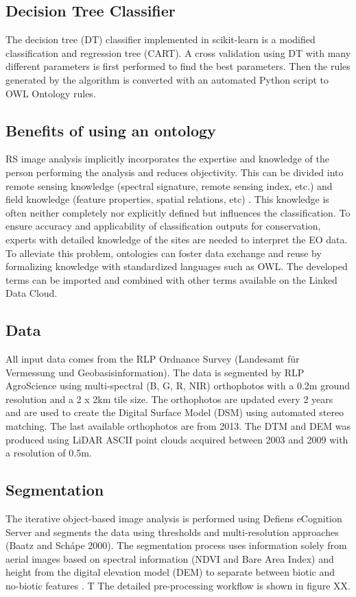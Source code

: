 \documentclass[authoryear, review,12pt,number]{elsarticle}
\begin{document}
\subsection{Decision Tree Classifier}
The decision tree (DT) classifier implemented in scikit-learn is a modified
classification and regression tree (CART)\citep{scikit-learn}. A cross
validation using DT with many different parameters is first performed to find
the best parameters. Then the rules generated by the algorithm is converted
with an automated Python script to OWL Ontology rules.

\subsection{Benefits of using an ontology}
RS image analysis implicitly incorporates the expertise and
knowledge of the person performing the analysis and reduces objectivity. This
can be divided into remote sensing knowledge (spectral signature, remote
sensing index, etc.) and field knowledge (feature properties, spatial
relations, etc) \citep{Andres2013a}. This knowledge is often neither completely
nor explicitly defined but influences the classification. To ensure accuracy and
applicability of classification outputs for conservation, experts with detailed
knowledge of the sites are needed to interpret the EO data. To alleviate this
problem, ontologies can foster data exchange and reuse by formalizing knowledge
with standardized languages such as OWL. The developed terms can be imported and
combined with other terms available on the Linked Data Cloud. 
\subsection{Data}
All input data comes from the RLP Ordnance Survey (Landesamt f\"ur Vermessung 
und Geobasisinformation). The data is segmented by RLP AgroScience using
multi-spectral (B, G, R, NIR) orthophotos with a 0.2m ground resolution and a
2 x 2km tile size. The orthophotos are updated every 2 years and are used to
create the Digital Surface Model (DSM) using automated stereo matching. The
last available orthophotos are from 2013. The DTM and
DEM was produced using LiDAR ASCII point clouds acquired between 2003 and 2009
with a resolution of 0.5m.\\
\subsection{Segmentation}
The iterative object-based image analysis is performed using Defiens eCognition
Server and segments the data using thresholds and multi-resolution approaches
(Baatz and Sch\'ape 2000). The segmentation process uses information solely
from aerial images based on spectral information (NDVI and Bare Area Index) and
height from the digital elevation model (DEM) to separate
between biotic and no-biotic features \citep{Tintrup2015}. T 
The detailed pre-processing workflow is shown in figure XX.
\end{document}
